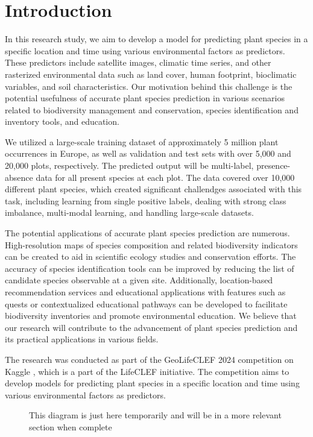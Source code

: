 \section{Introduction}

In this research study, we aim to develop a model for predicting plant species in a specific location and time using various environmental factors as predictors. These predictors include satellite images, climatic time series, and other rasterized environmental data such as land cover, human footprint, bioclimatic variables, and soil characteristics. Our motivation behind this challenge is the potential usefulness of accurate plant species prediction in various scenarios related to biodiversity management and conservation, species identification and inventory tools, and education.

We utilized a large-scale training dataset of approximately 5 million plant occurrences in Europe, as well as validation and test sets with over 5,000 and 20,000 plots, respectively. The predicted output will be multi-label, presence-absence data for all present species at each plot. The data covered over 10,000 different plant species, which created significant challendges associated with this task, including learning from single positive labels, dealing with strong class imbalance, multi-modal learning, and handling large-scale datasets.

The potential applications of accurate plant species prediction are numerous. High-resolution maps of species composition and related biodiversity indicators can be created to aid in scientific ecology studies and conservation efforts. The accuracy of species identification tools can be improved by reducing the list of candidate species observable at a given site. Additionally, location-based recommendation services and educational applications with features such as quests or contextualized educational pathways can be developed to facilitate biodiversity inventories and promote environmental education. We believe that our research will contribute to the advancement of plant species prediction and its practical applications in various fields.

The research was conducted as part of the GeoLifeCLEF 2024 competition on Kaggle \cite{geolifeclef-2024}, which is a part of the LifeCLEF initiative. The competition aims to develop models for predicting plant species in a specific location and time using various environmental factors as predictors.

\begin{figure}
    \begin{center}
        
        \caption{This diagram is just here temporarily and will be in a more relevant section when complete}
    \end{center}
\end{figure}